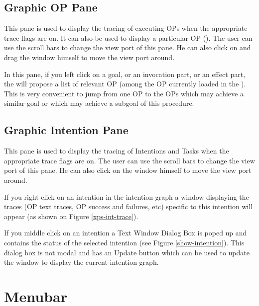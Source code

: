 \subsection{Graphic OP Pane}

This pane is used to display the tracing of executing OPs when the
appropriate trace flags are on. It can also be used to display a particular
OP (). The user can use the scroll bars to change the
view port of this pane. He can also click on and drag the window himself to
move the view port around.

In this pane, if you left click on a goal, or an invocation part, or an effect
part, the \XPK{} will propose a list of relevant OP (among the OP currently
loaded in the \XPK{}). This is very convenient to jump from one OP to the OPs
which may achieve a similar goal or which may achieve a subgoal of this procedure.

\subsection{Graphic Intention Pane}

This pane is used to display the tracing of Intentions and Tasks when the
appropriate trace flags are on. The user can use the scroll bars to change
the view port of this pane. He can also click on the window himself to move
the view port around.


If you right click on an intention in the intention graph a window displaying
the traces (OP text traces, OP success and failures, etc) specific to this
intention will appear (as shown on Figure \ref{xps-int-trace}).


If you middle click on an intention a Text Window Dialog Box is poped up and
contains the status of the selected intention (see Figure
\ref{show-intention}). This dialog box is not modal and has an Update button
which can be used to update the window to display the current intention graph.

\section{Menubar}

